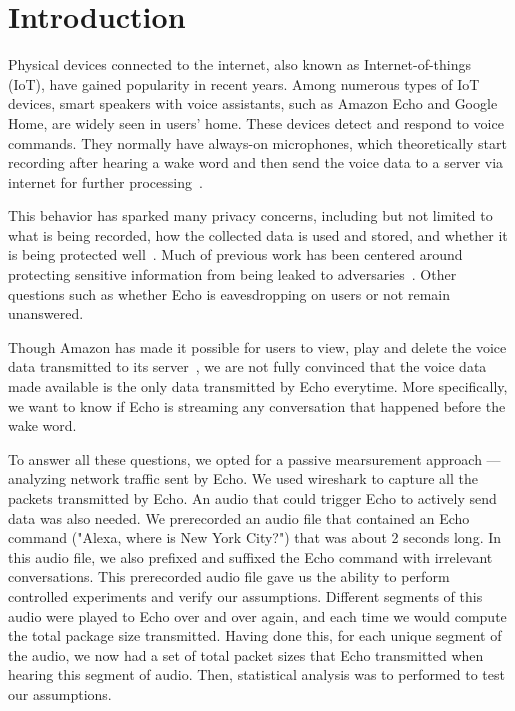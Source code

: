 \section{Introduction}
Physical devices connected to the internet, also known as Internet-of-things (IoT), have gained popularity in recent years. Among numerous types of IoT devices, smart speakers with voice assistants, such as Amazon Echo and Google Home, are widely seen in users' home. These devices detect and respond to voice commands. They normally have always-on microphones, which theoretically start recording after hearing a wake word and then send the voice data to a server via internet for further processing~\cite{AmazonEc68:online}.

This behavior has sparked many privacy concerns, including but not limited to what is being recorded, how the collected data is used and stored, and whether it is being protected well~\cite{lau2018alexa, fowler_2019, apthorpe2017smart, apthorpe2019keeping, apthorpe2017spying}. Much of previous work has been centered around protecting sensitive information from being leaked to adversaries~\cite{apthorpe2017smart, apthorpe2019keeping, apthorpe2017spying}. Other questions such as whether Echo is eavesdropping on users or not remain unanswered.

Though Amazon has made it possible for users to view, play and delete the voice data transmitted to its server~\cite{ford2019alexa}, we are not fully convinced that the voice data made available is the only data transmitted by Echo everytime. More specifically, we want to know if Echo is streaming any conversation that happened before the wake word.  

To answer all these questions, we opted for a passive mearsurement approach --- analyzing network traffic sent by Echo. We used wireshark to capture all the packets transmitted by Echo. An audio that could trigger Echo to actively send data was also needed. We prerecorded an audio file that contained an Echo command ("Alexa, where is New York City?") that was about 2 seconds long. In this audio file, we also prefixed and suffixed the Echo command with irrelevant conversations. This prerecorded audio file gave us the ability to perform controlled experiments and verify our assumptions. Different segments of this audio were played to Echo over and over again, and each time we would compute the total package size transmitted. Having done this, for each unique segment of the audio, we now had a set of total packet sizes that Echo transmitted when hearing this segment of audio. Then, statistical analysis was to performed to test our assumptions.


